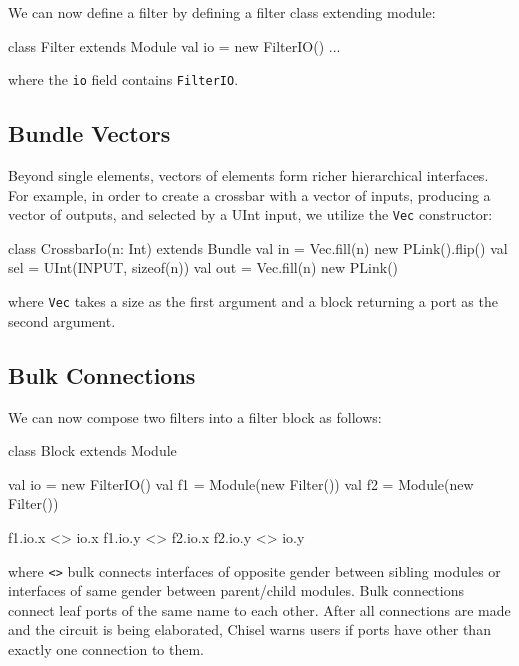 \documentclass[twocolumn,10pt]{article}
\begin{document}
We can now define a filter by defining a filter class extending module:

\begin{scala}
class Filter extends Module { 
  val io = new FilterIO()
  ...
}
\end{scala}

\noindent 
where the \verb+io+ field contains \verb+FilterIO+. 

\subsection{Bundle Vectors}

Beyond single elements, vectors of elements form richer hierarchical interfaces.  
For example, in order to create a crossbar with a vector of inputs, producing a vector of outputs, and selected by a UInt input, 
we utilize the \verb+Vec+ constructor:

\begin{scala}
class CrossbarIo(n: Int) extends Bundle {
  val in  = Vec.fill(n){ new PLink().flip() }
  val sel = UInt(INPUT, sizeof(n))
  val out = Vec.fill(n){ new PLink() }
}
\end{scala}


\noindent
where \verb+Vec+ takes a size as the first argument and a block returning a port as the second argument.

\subsection{Bulk Connections}

We can now compose two filters into a filter block as follows:

\begin{scala}
class Block extends Module { 
  val io = new FilterIO()
  val f1 = Module(new Filter())
  val f2 = Module(new Filter())

  f1.io.x <> io.x
  f1.io.y <> f2.io.x
  f2.io.y <> io.y
}
\end{scala}

\noindent
where \verb+<>+ bulk connects interfaces of opposite gender between
sibling modules or interfaces of same gender between parent/child modules. 
Bulk connections connect leaf ports of the same name to each other.
After all connections are made and the circuit is being elaborated,
Chisel warns users if ports have other than exactly one connection to them.
\end{document}
